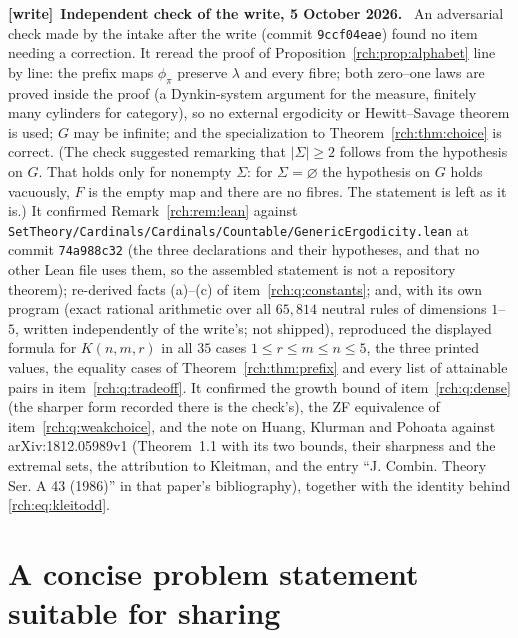 \documentclass[11pt]{article}
\theoremstyle{definition}
\theoremstyle{remark}
\newcommand{\file}[1]{\nolinkurl{#1}}
\newenvironment{writenote}[1][]{\par\smallskip\begingroup\small
 \noindent\textbf{[write]}\if\relax\detokenize{#1}\relax\else~\textbf{#1.}\fi\ }%
 {\par\endgroup\smallskip}
\begin{document}
\begin{writenote}[Independent check of the write, 5 October 2026]
An adversarial check made by the intake after the write (commit
\file{9ccf04eae}) found no item needing a correction. It reread the proof of
Proposition~\ref{rch:prop:alphabet} line by line: the prefix maps
$\phi_\pi$ preserve $\lambda$ and every fibre; both zero--one laws are
proved inside the proof (a Dynkin-system argument for the measure, finitely
many cylinders for category), so no external ergodicity or Hewitt--Savage
theorem is used; $G$ may be infinite; and the specialization to
Theorem~\ref{rch:thm:choice} is correct. (The check suggested remarking that
$\lvert\Sigma\rvert\ge2$ follows from the hypothesis on $G$. That holds only
for nonempty $\Sigma$: for $\Sigma=\varnothing$ the hypothesis on $G$ holds
vacuously, $F$ is the empty map and there are no fibres. The statement is
left as it is.) It confirmed Remark~\ref{rch:rem:lean} against
\file{SetTheory/Cardinals/Cardinals/Countable/GenericErgodicity.lean} at
commit \file{74a988c32} (the three declarations and their hypotheses, and
that no other Lean file uses them, so the assembled statement is not a
repository theorem); re-derived facts (a)--(c) of
item~\ref{rch:q:constants}; and, with its own program (exact rational
arithmetic over all $65{,}814$ neutral rules of dimensions $1$--$5$, written
independently of the write's; not shipped), reproduced the displayed
formula for $K(n,m,r)$ in all $35$ cases $1\le r\le m\le n\le5$, the three
printed values, the equality cases of Theorem~\ref{rch:thm:prefix} and every
list of attainable pairs in item~\ref{rch:q:tradeoff}. It confirmed the
growth bound of item~\ref{rch:q:dense} (the sharper form recorded there is
the check's), the ZF equivalence of item~\ref{rch:q:weakchoice}, and the
note on Huang, Klurman and Pohoata against arXiv:1812.05989v1 (Theorem~1.1
with its two bounds, their sharpness and the extremal sets, the attribution
to Kleitman, and the entry ``J. Combin. Theory Ser. A 43 (1986)'' in that
paper's bibliography), together with the identity behind
\eqref{rch:eq:kleitodd}.
\end{writenote}

\clearpage
\appendix
\section{A concise problem statement suitable for sharing}
\end{document}
